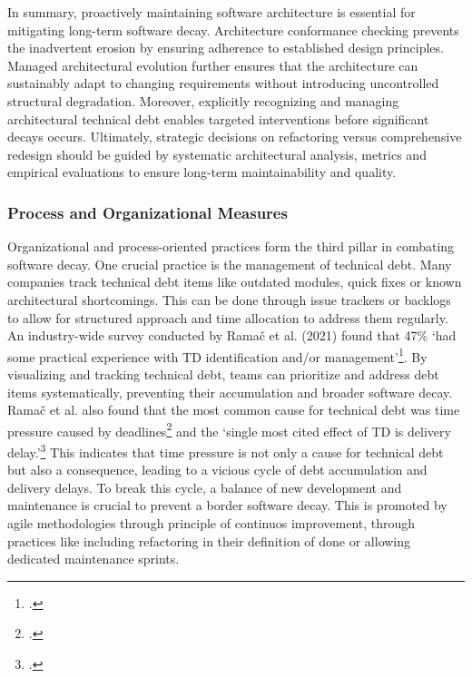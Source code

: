 In summary, proactively maintaining software architecture is essential for mitigating long-term software decay. Architecture conformance checking 
prevents the inadvertent erosion by ensuring adherence to established design principles. Managed architectural evolution further ensures that the architecture
can sustainably adapt to changing requirements without introducing uncontrolled structural degradation. Moreover, explicitly recognizing and managing architectural
technical debt enables targeted interventions before significant decays occurs. Ultimately, strategic decisions on refactoring versus comprehensive redesign should be 
guided by systematic architectural analysis, metrics and empirical evaluations to ensure long-term maintainability and quality.

\subsubsection{Process and Organizational Measures}
Organizational and process-oriented practices form the third pillar in combating software decay.
One crucial practice is the management of technical debt. Many companies track technical debt items like outdated modules, quick fixes or known architectural shortcomings.
This can be done through issue trackers or backlogs to allow for structured approach and time allocation to address them regularly.
An industry-wide survey conducted by Ramač et al. (2021) found that 47\% `had some practical experience with TD identification and/or management'\footcite[40]{ramacPrevalenceCommonCauses2021}.
By visualizing and tracking technical debt, teams can prioritize and address debt items systematically, preventing their accumulation and broader software decay.
Ramač et al. also found that the most common cause for technical debt was time pressure caused by deadlines\footcite[40]{ramacPrevalenceCommonCauses2021} and the `single most cited effect of TD is delivery delay.'\footcite[40]{ramacPrevalenceCommonCauses2021}
This indicates that time pressure is not only a cause for technical debt but also a consequence, leading to a vicious cycle of debt accumulation and delivery delays. To break this cycle, a balance of new development and maintenance is crucial to prevent a border software decay.
This is promoted by agile methodologies through principle of continuos improvement, through practices like including refactoring in their definition of done or allowing dedicated maintenance sprints.

